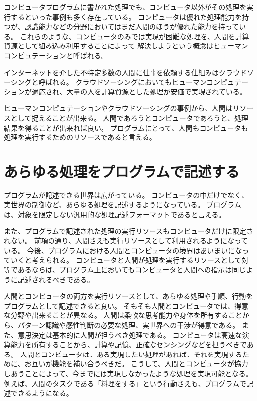 コンピュータプログラムに書かれた処理でも、コンピュータ以外がその処理を実行するといった事例も多く存在している。
コンピュータは優れた処理能力を持つが、認識能力などの分野においてはまだ人間のほうが優れた能力を持っている。
これらのような、コンピュータのみでは実現が困難な処理を、人間を計算資源として組み込み利用することによって
解決しようという概念はヒューマンコンピュテーション\cite{humancomputation}と呼ばれる。

インターネットを介した不特定多数の人間に仕事を依頼する仕組みはクラウドソーシングと呼ばれる。
クラウドソーシングにおいてもヒューマンコンピュテーションが適応され、大量の人を計算資源とした処理が安価で実現されている。

ヒューマンコンピュテーションやクラウドソーシングの事例から、人間はリソースとして捉えることが出来る。
人間であろうとコンピュータであろうと、処理結果を得ることが出来れば良い。
プログラムにとって、人間もコンピュータも処理を実行するためのリソースであると言える。

\section{あらゆる処理をプログラムで記述する}\label{ux3042ux3089ux3086ux308bux51e6ux7406ux3092ux30d7ux30edux30b0ux30e9ux30e0ux3067ux8a18ux8ff0ux3059ux308b}

プログラムが記述できる世界は広がっている。
コンピュータの中だけでなく、実世界の制御など、あらゆる処理を記述するようになっている。
プログラムは、対象を限定しない汎用的な処理記述フォーマットであると言える。

また、プログラムで記述された処理の実行リソースもコンピュータだけに限定されない。
前項の通り、人間さえも実行リソースとして利用されるようになっている。
今後、プログラムにおける人間とコンピュータの境界はあいまいになっていくと考えられる。
コンピュータと人間が処理を実行するリソースとして対等であるならば、プログラム上においてもコンピュータと人間への指示は同じように記述されるべきである。

人間とコンピュータの両方を実行リソースとして、あらゆる処理や手順、行動をプログラムとして記述できると良い。
そもそも人間とコンピュータでは、得意な分野や出来ることが異なる。
人間は柔軟な思考能力や身体を所有することから、パターン認識や感性判断の必要な処理、実世界への干渉が得意である。
また、意思決定は基本的に人間が担うべき処理である。
コンピュータは高速な演算能力を所有することから、計算や記憶、正確なセンシングなどを担うべきである。
人間とコンピュータは、ある実現したい処理があれば、それを実現するために、お互いが機能を補い合うべきだ。
こうして、人間とコンピュータが協力しあうことによって、今までには実現しなかったような処理を実現可能となる。
例えば、人間のタスクである「料理をする」という行動さえも、プログラムで記述できるようになる。

